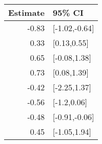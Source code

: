 \begin{tabular}{rl}
  \hline
Estimate & 95\% CI \\ 
  \hline
-0.83 & [-1.02,-0.64] \\ 
  0.33 & [0.13,0.55] \\ 
  0.65 & [-0.08,1.38] \\ 
  0.73 & [0.08,1.39] \\ 
  -0.42 & [-2.25,1.37] \\ 
  -0.56 & [-1.2,0.06] \\ 
  -0.48 & [-0.91,-0.06] \\ 
  0.45 & [-1.05,1.94] \\ 
   \hline
\end{tabular}

